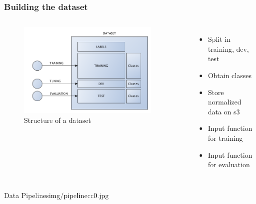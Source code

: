 \documentclass[aspectratio=169,11pt,hyperref={colorlinks=true}]{beamer}
\begin{document}
\begin{frame}
    \frametitle{Building the dataset}
    \begin{columns}
        \begin{figure}
        \begin{center}
          \includegraphics[width=0.9\textwidth]{diagrams/dataset.png}
             \caption{Structure of a dataset}
        \end{center}
        \end{figure}
        \begin{itemize}
            \item{Split in training, dev, test}
            \item{Obtain classes}
            \item{Store normalized data on s3}
            \item{Input function for training}
            \item{Input function for evaluation}
        \end{itemize}
    \end{columns}
\end{frame}

\begin{sectionpic}
{Data Pipelines}{img/pipelinecc0.jpg}
\end{sectionpic}
\end{document}

